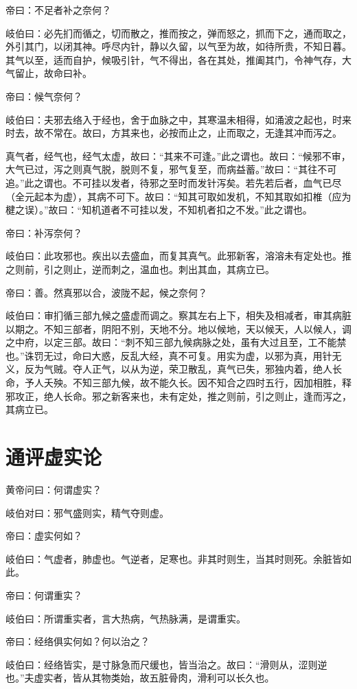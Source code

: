 \documentclass{article}%
\begin{document}
帝曰：不足者补之奈何？

岐伯曰：必先扪而循之，切而散之，推而按之，弹而怒之，抓而下之，通而取之，外引其门，以闭其神。呼尽内针，静以久留，以气至为故，如待所贵，不知日暮。其气以至，适而自护，候吸引针，气不得出，各在其处，推阖其门，令神气存，大气留止，故命曰补。

帝曰：候气奈何？

岐伯曰：夫邪去络入于经也，舍于血脉之中，其寒温未相得，如涌波之起也，时来时去，故不常在。故曰，方其来也，必按而止之，止而取之，无逢其冲而泻之。

真气者，经气也，经气太虚，故曰：“其来不可逢。”此之谓也。故曰：“候邪不审，大气已过，泻之则真气脱，脱则不复，邪气复至，而病益蓄。”故曰：“其往不可追。”此之谓也。不可挂以发者，待邪之至时而发针泻矣。若先若后者，血气已尽（全元起本为虚），其病不可下。故曰：“知其可取如发机，不知其取如扣椎（应为楗之误）。”故曰：“知机道者不可挂以发，不知机者扣之不发。”此之谓也。

帝曰：补泻奈何？

岐伯曰：此攻邪也。疾出以去盛血，而复其真气。此邪新客，溶溶未有定处也。推之则前，引之则止，逆而刺之，温血也。刺出其血，其病立已。

帝曰：善。然真邪以合，波陇不起，候之奈何？

岐伯曰：审扪循三部九候之盛虚而调之。察其左右上下，相失及相减者，审其病脏以期之。不知三部者，阴阳不别，天地不分。地以候地，天以候天，人以候人，调之中府，以定三部。故曰：“刺不知三部九候病脉之处，虽有大过且至，工不能禁也。”诛罚无过，命曰大惑，反乱大经，真不可复。用实为虚，以邪为真，用针无义，反为气贼。夺人正气，以从为逆，荣卫散乱，真气已失，邪独内着，绝人长命，予人夭殃。不知三部九候，故不能久长。因不知合之四时五行，因加相胜，释邪攻正，绝人长命。邪之新客来也，未有定处，推之则前，引之则止，逢而泻之，其病立已。
\section{通评虚实论}
黄帝问曰：何谓虚实？

岐伯对曰：邪气盛则实，精气夺则虚。

帝曰：虚实何如？

岐伯曰：气虚者，肺虚也。气逆者，足寒也。非其时则生，当其时则死。余脏皆如此。

帝曰：何谓重实？

岐伯曰：所谓重实者，言大热病，气热脉满，是谓重实。

帝曰：经络俱实何如？何以治之？

岐伯曰：经络皆实，是寸脉急而尺缓也，皆当治之。故曰：“滑则从，涩则逆也。”夫虚实者，皆从其物类始，故五脏骨肉，滑利可以长久也。
\end{document}
